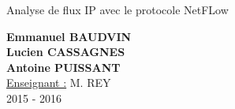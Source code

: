 \begin{titlepage}
\begin{center}
        \vspace{0.5cm}
        
        Analyse de flux IP avec le protocole NetFLow
        
        \vspace{2cm}
        \textbf{Emmanuel BAUDVIN\\Lucien CASSAGNES\\Antoine PUISSANT}\\
        \vspace{0.8cm}
        \Large
        \underline{Enseignant :} M. REY\\
        \vspace{0.5cm}
        2015 - 2016%
        
    \end{center}
\end{titlepage}
